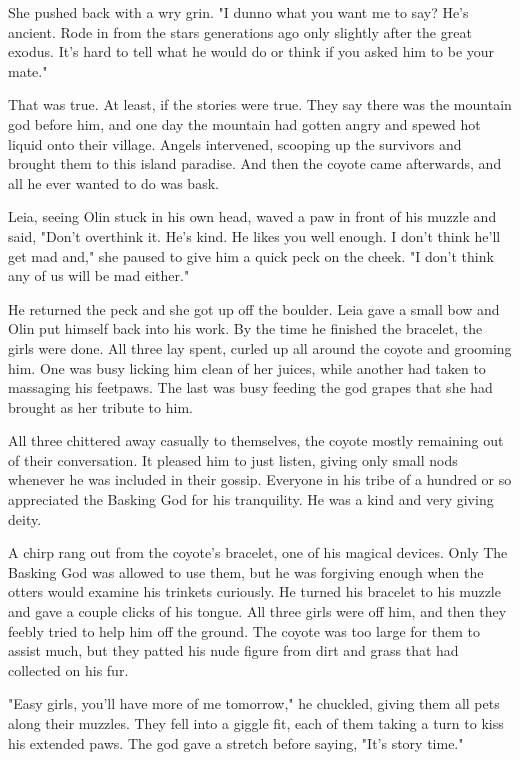 She pushed back with a wry grin. "I dunno what you want me to say? He's ancient. Rode in from the stars generations ago only slightly after the great exodus. It's hard to tell what he would do or think if you asked him to be your mate."

That was true. At least, if the stories were true. They say there was the mountain god before him, and one day the mountain had gotten angry and spewed hot liquid onto their village. Angels intervened, scooping up the survivors and brought them to this island paradise. And then the coyote came afterwards, and all he ever wanted to do was bask.

Leia, seeing Olin stuck in his own head, waved a paw in front of his muzzle and said, "Don't overthink it. He's kind. He likes you well enough. I don't think he'll get mad and," she paused to give him a quick peck on the cheek. "I don't think any of us will be mad either."

He returned the peck and she got up off the boulder. Leia gave a small bow and Olin put himself back into his work. By the time he finished the bracelet, the girls were done. All three lay spent, curled up all around the coyote and grooming him. One was busy licking him clean of her juices, while another had taken to massaging his feetpaws. The last was busy feeding the god grapes that she had brought as her tribute to him.

All three chittered away casually to themselves, the coyote mostly remaining out of their conversation. It pleased him to just listen, giving only small nods whenever he was included in their gossip. Everyone in his tribe of a hundred or so appreciated the Basking God for his tranquility. He was a kind and very giving deity.

A chirp rang out from the coyote's bracelet, one of his magical devices. Only The Basking God was allowed to use them, but he was forgiving enough when the otters would examine his trinkets curiously. He turned his bracelet to his muzzle and gave a couple clicks of his tongue. All three girls were off him, and then they feebly tried to help him off the ground. The coyote was too large for them to assist much, but they patted his nude figure from dirt and grass that had collected on his fur.

"Easy girls, you'll have more of me tomorrow," he chuckled, giving them all pets along their muzzles. They fell into a giggle fit, each of them taking a turn to kiss his extended paws. The god gave a stretch before saying, "It's story time."

